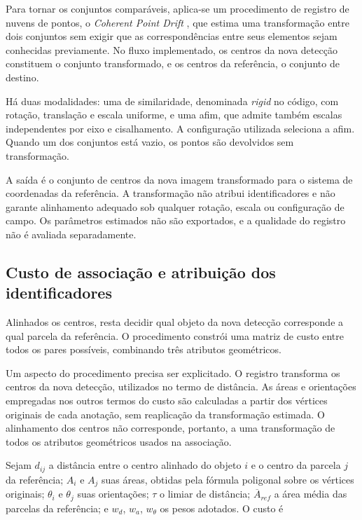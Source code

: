 Para tornar os conjuntos compar\'aveis, aplica-se um procedimento de registro de nuvens de pontos, o \textit{Coherent Point Drift} \citep{myronenko2010}, que estima uma transforma\c{c}\~ao entre dois conjuntos sem exigir que as correspond\^encias entre seus elementos sejam conhecidas previamente. No fluxo implementado, os centros da nova detec\c{c}\~ao constituem o conjunto transformado, e os centros da refer\^encia, o conjunto de destino.

H\'a duas modalidades: uma de similaridade, denominada \textit{rigid} no c\'odigo, com rota\c{c}\~ao, transla\c{c}\~ao e escala uniforme, e uma afim, que admite tamb\'em escalas independentes por eixo e cisalhamento. A configura\c{c}\~ao utilizada seleciona a afim. Quando um dos conjuntos est\'a vazio, os pontos s\~ao devolvidos sem transforma\c{c}\~ao.

A sa\'ida \'e o conjunto de centros da nova imagem transformado para o sistema de coordenadas da refer\^encia. A transforma\c{c}\~ao n\~ao atribui identificadores e n\~ao garante alinhamento adequado sob qualquer rota\c{c}\~ao, escala ou configura\c{c}\~ao de campo. Os par\^ametros estimados n\~ao s\~ao exportados, e a qualidade do registro n\~ao \'e avaliada separadamente.

\subsection{Custo de associa\c{c}\~ao e atribui\c{c}\~ao dos identificadores}
\label{sec:custo-associacao-identificadores}

Alinhados os centros, resta decidir qual objeto da nova detec\c{c}\~ao corresponde a qual parcela da refer\^encia. O procedimento constr\'oi uma matriz de custo entre todos os pares poss\'iveis, combinando tr\^es atributos geom\'etricos.

Um aspecto do procedimento precisa ser explicitado. O registro transforma os centros da nova detec\c{c}\~ao, utilizados no termo de dist\^ancia. As \'areas e orienta\c{c}\~oes empregadas nos outros termos do custo s\~ao calculadas a partir dos v\'ertices originais de cada anota\c{c}\~ao, sem reaplica\c{c}\~ao da transforma\c{c}\~ao estimada. O alinhamento dos centros n\~ao corresponde, portanto, a uma transforma\c{c}\~ao de todos os atributos geom\'etricos usados na associa\c{c}\~ao.

Sejam $d_{ij}$ a dist\^ancia entre o centro alinhado do objeto $i$ e o centro da parcela $j$ da refer\^encia; $A_i$ e $A_j$ suas \'areas, obtidas pela f\'ormula poligonal sobre os v\'ertices originais; $\theta_i$ e $\theta_j$ suas orienta\c{c}\~oes; $\tau$ o limiar de dist\^ancia; $\overline{A}_{ref}$ a \'area m\'edia das parcelas da refer\^encia; e $w_d$, $w_a$, $w_\theta$ os pesos adotados. O custo \'e

